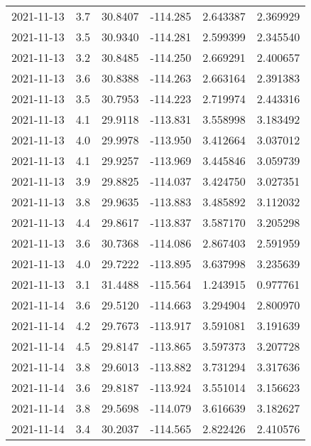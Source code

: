 \begin{tabular}{lrrrrr}
2021-11-13 &       3.7 &  30.8407 &  -114.285 &         2.643387 &         2.369929 \\
2021-11-13 &       3.5 &  30.9340 &  -114.281 &         2.599399 &         2.345540 \\
2021-11-13 &       3.2 &  30.8485 &  -114.250 &         2.669291 &         2.400657 \\
2021-11-13 &       3.6 &  30.8388 &  -114.263 &         2.663164 &         2.391383 \\
2021-11-13 &       3.5 &  30.7953 &  -114.223 &         2.719974 &         2.443316 \\
2021-11-13 &       4.1 &  29.9118 &  -113.831 &         3.558998 &         3.183492 \\
2021-11-13 &       4.0 &  29.9978 &  -113.950 &         3.412664 &         3.037012 \\
2021-11-13 &       4.1 &  29.9257 &  -113.969 &         3.445846 &         3.059739 \\
2021-11-13 &       3.9 &  29.8825 &  -114.037 &         3.424750 &         3.027351 \\
2021-11-13 &       3.8 &  29.9635 &  -113.883 &         3.485892 &         3.112032 \\
2021-11-13 &       4.4 &  29.8617 &  -113.837 &         3.587170 &         3.205298 \\
2021-11-13 &       3.6 &  30.7368 &  -114.086 &         2.867403 &         2.591959 \\
2021-11-13 &       4.0 &  29.7222 &  -113.895 &         3.637998 &         3.235639 \\
2021-11-13 &       3.1 &  31.4488 &  -115.564 &         1.243915 &         0.977761 \\
2021-11-14 &       3.6 &  29.5120 &  -114.663 &         3.294904 &         2.800970 \\
2021-11-14 &       4.2 &  29.7673 &  -113.917 &         3.591081 &         3.191639 \\
2021-11-14 &       4.5 &  29.8147 &  -113.865 &         3.597373 &         3.207728 \\
2021-11-14 &       3.8 &  29.6013 &  -113.882 &         3.731294 &         3.317636 \\
2021-11-14 &       3.6 &  29.8187 &  -113.924 &         3.551014 &         3.156623 \\
2021-11-14 &       3.8 &  29.5698 &  -114.079 &         3.616639 &         3.182627 \\
2021-11-14 &       3.4 &  30.2037 &  -114.565 &         2.822426 &         2.410576 \\

\end{tabular}
